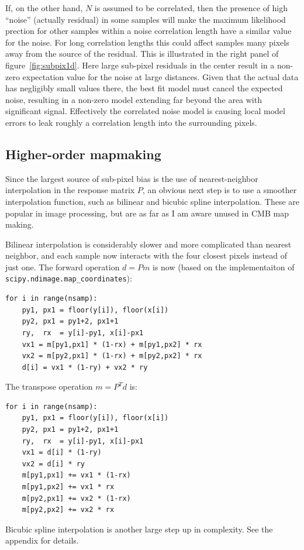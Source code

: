 \documentclass{article}
\newcommand{\code}[1]{\texttt{#1}}
\begin{document}
If, on the other hand, $N$ is assumed to be correlated, then the presence of high
``noise'' (actually residual) in some samples
will make the maximum likelihood prection for other samples within a noise correlation length
have a similar value for the noise. For long correlation lengths this could affect samples
many pixels away from the source of the residual. This is illustrated in the right panel
of figure~\ref{fig:subpix1d}. Here large sub-pixel residuals in the center result in a non-zero expectation
value for the noise at large distances. Given that the actual data has negligibly small values
there, the best fit model must cancel the expected noise, resulting in a non-zero model
extending far beyond the area with significant signal. Effectively the correlated
noise model is causing local model errors to leak roughly a correlation length
into the surrounding pixels.

\subsection{Higher-order mapmaking}
Since the largest source of sub-pixel bias is the use of nearest-neighbor interpolation in
the response matrix $P$, an obvious next step is to use a smoother interpolation function,
such as bilinear and bicubic spline interpolation. These are popular in image processing, but
are as far as I am aware unused in CMB map making.

Bilinear interpolation is considerably slower and more complicated than nearest neighbor,
and each sample now interacts with the four closest pixels instead of just one.
The forward operation $d=Pm$ is now (based on the implementaiton of \code{scipy.ndimage.map\_coordinates}):
\begin{lstlisting}
for i in range(nsamp):
	py1, px1 = floor(y[i]), floor(x[i])
	py2, px1 = py1+2, px1+1
	ry,  rx  = y[i]-py1, x[i]-px1
	vx1 = m[py1,px1] * (1-rx) + m[py1,px2] * rx
	vx2 = m[py2,px1] * (1-rx) + m[py2,px2] * rx
	d[i] = vx1 * (1-ry) + vx2 * ry
\end{lstlisting}
The transpose operation $m=P^Td$ is:
\begin{lstlisting}
for i in range(nsamp):
	py1, px1 = floor(y[i]), floor(x[i])
	py2, px1 = py1+2, px1+1
	ry,  rx  = y[i]-py1, x[i]-px1
	vx1 = d[i] * (1-ry)
	vx2 = d[i] * ry
	m[py1,px1] += vx1 * (1-rx)
	m[py1,px2] += vx1 * rx
	m[py2,px1] += vx2 * (1-rx)
	m[py2,px2] += vx2 * rx
\end{lstlisting}
Bicubic spline interpolation is another large step up in complexity. See the appendix for details.
\end{document}
